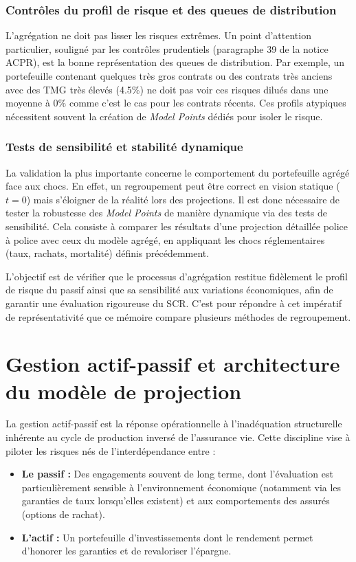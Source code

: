 \subsubsection{Contrôles du profil de risque et des queues de distribution}
L'agrégation ne doit pas lisser les risques extrêmes. Un point d'attention particulier, souligné par les contrôles prudentiels (paragraphe 39 de la notice ACPR), est la bonne représentation des queues de distribution.
Par exemple, un portefeuille contenant quelques très gros contrats ou des contrats très anciens avec des TMG très élevés (4.5\%) ne doit pas voir ces risques dilués dans une moyenne à 0\% comme c'est le cas pour les contrats récents. Ces profils atypiques nécessitent souvent la création de \textit{Model Points} dédiés pour isoler le risque.

\subsubsection{Tests de sensibilité et stabilité dynamique}

La validation la plus importante concerne le comportement du portefeuille agrégé face aux chocs. En effet, un regroupement peut être correct en vision statique ($t=0$) mais s'éloigner de la réalité lors des projections. Il est donc nécessaire de tester la robustesse des \textit{Model Points} de manière dynamique via des tests de sensibilité. Cela consiste à comparer les résultats d'une projection détaillée police à police avec ceux du modèle agrégé, en appliquant les chocs réglementaires (taux, rachats, mortalité) définis précédemment.

L'objectif est de vérifier que le processus d'agrégation restitue fidèlement le profil de risque du passif ainsi que sa sensibilité aux variations économiques, afin de garantir une évaluation rigoureuse du SCR. C'est pour répondre à cet impératif de représentativité que ce mémoire compare plusieurs méthodes de regroupement.


\section{Gestion actif-passif et architecture du modèle de projection}
\label{sec:alm_modele}

La gestion actif-passif est la réponse opérationnelle à l'inadéquation structurelle inhérente au cycle de production inversé de l'assurance vie. Cette discipline vise à piloter les risques nés de l'interdépendance entre :
\begin{itemize}
    \item \textbf{Le passif :} Des engagements souvent de long terme, dont l'évaluation est particulièrement sensible à l'environnement économique (notamment via les garanties de taux lorsqu'elles existent) et aux comportements des assurés (options de rachat).
    \item \textbf{L'actif :} Un portefeuille d'investissements dont le rendement permet d'honorer les garanties et de revaloriser l'épargne.

\end{itemize}

